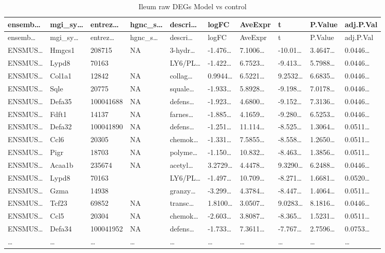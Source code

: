 \documentclass[
]{article}
\begin{document}
\begin{longtable}[]{@{}llllllllll@{}}
\caption{\label{tab:Ileum-raw-DEGs-Model-vs-control}Ileum raw DEGs Model vs control}\tabularnewline
\toprule
ensemb\ldots{} & mgi\_sy\ldots{} & entrez\ldots{} & hgnc\_s\ldots{} & descri\ldots{} & logFC & AveExpr & t & P.Value & adj.P.Val\tabularnewline
\midrule
\endfirsthead
\toprule
ensemb\ldots{} & mgi\_sy\ldots{} & entrez\ldots{} & hgnc\_s\ldots{} & descri\ldots{} & logFC & AveExpr & t & P.Value & adj.P.Val\tabularnewline
\midrule
\endhead
ENSMUS\ldots{} & Hmgcs1 & 208715 & NA & 3-hydr\ldots{} & -1.476\ldots{} & 7.1006\ldots{} & -10.01\ldots{} & 3.4647\ldots{} & 0.0446\ldots{}\tabularnewline
ENSMUS\ldots{} & Lypd8 & 70163 & & LY6/PL\ldots{} & -1.422\ldots{} & 6.7523\ldots{} & -9.413\ldots{} & 5.7988\ldots{} & 0.0446\ldots{}\tabularnewline
ENSMUS\ldots{} & Col1a1 & 12842 & NA & collag\ldots{} & 0.9944\ldots{} & 6.5221\ldots{} & 9.2532\ldots{} & 6.6835\ldots{} & 0.0446\ldots{}\tabularnewline
ENSMUS\ldots{} & Sqle & 20775 & NA & squale\ldots{} & -1.933\ldots{} & 5.8928\ldots{} & -9.198\ldots{} & 7.0178\ldots{} & 0.0446\ldots{}\tabularnewline
ENSMUS\ldots{} & Defa35 & 100041688 & NA & defens\ldots{} & -1.923\ldots{} & 4.6800\ldots{} & -9.152\ldots{} & 7.3136\ldots{} & 0.0446\ldots{}\tabularnewline
ENSMUS\ldots{} & Fdft1 & 14137 & NA & farnes\ldots{} & -1.885\ldots{} & 4.1659\ldots{} & -9.280\ldots{} & 6.5253\ldots{} & 0.0446\ldots{}\tabularnewline
ENSMUS\ldots{} & Defa32 & 100041890 & NA & defens\ldots{} & -1.251\ldots{} & 11.114\ldots{} & -8.525\ldots{} & 1.3064\ldots{} & 0.0511\ldots{}\tabularnewline
ENSMUS\ldots{} & Ccl6 & 20305 & NA & chemok\ldots{} & -1.331\ldots{} & 7.5855\ldots{} & -8.558\ldots{} & 1.2650\ldots{} & 0.0511\ldots{}\tabularnewline
ENSMUS\ldots{} & Pigr & 18703 & NA & polyme\ldots{} & -1.150\ldots{} & 10.832\ldots{} & -8.463\ldots{} & 1.3856\ldots{} & 0.0511\ldots{}\tabularnewline
ENSMUS\ldots{} & Acaa1b & 235674 & NA & acetyl\ldots{} & 3.2729\ldots{} & 4.4478\ldots{} & 9.3290\ldots{} & 6.2488\ldots{} & 0.0446\ldots{}\tabularnewline
ENSMUS\ldots{} & Lypd8 & 70163 & & LY6/PL\ldots{} & -1.497\ldots{} & 10.709\ldots{} & -8.271\ldots{} & 1.6681\ldots{} & 0.0520\ldots{}\tabularnewline
ENSMUS\ldots{} & Gzma & 14938 & & granzy\ldots{} & -3.299\ldots{} & 4.3784\ldots{} & -8.447\ldots{} & 1.4064\ldots{} & 0.0511\ldots{}\tabularnewline
ENSMUS\ldots{} & Tcf23 & 69852 & NA & transc\ldots{} & 1.8100\ldots{} & 3.0507\ldots{} & 9.0283\ldots{} & 8.1816\ldots{} & 0.0446\ldots{}\tabularnewline
ENSMUS\ldots{} & Ccl5 & 20304 & NA & chemok\ldots{} & -2.603\ldots{} & 3.8087\ldots{} & -8.365\ldots{} & 1.5231\ldots{} & 0.0511\ldots{}\tabularnewline
ENSMUS\ldots{} & Defa34 & 100041952 & NA & defens\ldots{} & -1.733\ldots{} & 7.3611\ldots{} & -7.767\ldots{} & 2.7596\ldots{} & 0.0753\ldots{}\tabularnewline
\ldots{} & \ldots{} & \ldots{} & \ldots{} & \ldots{} & \ldots{} & \ldots{} & \ldots{} & \ldots{} & \ldots{}\tabularnewline
\bottomrule
\end{longtable}
\end{document}
